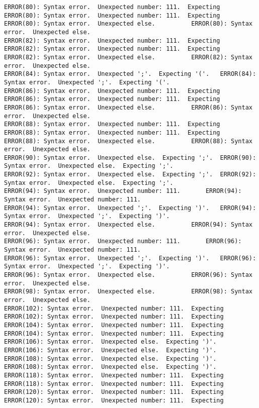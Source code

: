 \documentclass[12pt]{book}
\begin{document}
\begin{lstlisting}
ERROR(80): Syntax error.  Unexpected number: 111.  Expecting 	ERROR(80): Syntax error.  Unexpected number: 111.  Expecting 
ERROR(80): Syntax error.  Unexpected else.			ERROR(80): Syntax error.  Unexpected else.
ERROR(82): Syntax error.  Unexpected number: 111.  Expecting 	ERROR(82): Syntax error.  Unexpected number: 111.  Expecting 
ERROR(82): Syntax error.  Unexpected else.			ERROR(82): Syntax error.  Unexpected else.
ERROR(84): Syntax error.  Unexpected ';'.  Expecting '('.	ERROR(84): Syntax error.  Unexpected ';'.  Expecting '('.
ERROR(86): Syntax error.  Unexpected number: 111.  Expecting 	ERROR(86): Syntax error.  Unexpected number: 111.  Expecting 
ERROR(86): Syntax error.  Unexpected else.			ERROR(86): Syntax error.  Unexpected else.
ERROR(88): Syntax error.  Unexpected number: 111.  Expecting 	ERROR(88): Syntax error.  Unexpected number: 111.  Expecting 
ERROR(88): Syntax error.  Unexpected else.			ERROR(88): Syntax error.  Unexpected else.
ERROR(90): Syntax error.  Unexpected else.  Expecting ';'.	ERROR(90): Syntax error.  Unexpected else.  Expecting ';'.
ERROR(92): Syntax error.  Unexpected else.  Expecting ';'.	ERROR(92): Syntax error.  Unexpected else.  Expecting ';'.
ERROR(94): Syntax error.  Unexpected number: 111.		ERROR(94): Syntax error.  Unexpected number: 111.
ERROR(94): Syntax error.  Unexpected ';'.  Expecting ')'.	ERROR(94): Syntax error.  Unexpected ';'.  Expecting ')'.
ERROR(94): Syntax error.  Unexpected else.			ERROR(94): Syntax error.  Unexpected else.
ERROR(96): Syntax error.  Unexpected number: 111.		ERROR(96): Syntax error.  Unexpected number: 111.
ERROR(96): Syntax error.  Unexpected ';'.  Expecting ')'.	ERROR(96): Syntax error.  Unexpected ';'.  Expecting ')'.
ERROR(96): Syntax error.  Unexpected else.			ERROR(96): Syntax error.  Unexpected else.
ERROR(98): Syntax error.  Unexpected else.			ERROR(98): Syntax error.  Unexpected else.
ERROR(102): Syntax error.  Unexpected number: 111.  Expecting	ERROR(102): Syntax error.  Unexpected number: 111.  Expecting
ERROR(104): Syntax error.  Unexpected number: 111.  Expecting	ERROR(104): Syntax error.  Unexpected number: 111.  Expecting
ERROR(106): Syntax error.  Unexpected else.  Expecting ')'.	ERROR(106): Syntax error.  Unexpected else.  Expecting ')'.
ERROR(108): Syntax error.  Unexpected else.  Expecting ')'.	ERROR(108): Syntax error.  Unexpected else.  Expecting ')'.
ERROR(118): Syntax error.  Unexpected number: 111.  Expecting	ERROR(118): Syntax error.  Unexpected number: 111.  Expecting
ERROR(120): Syntax error.  Unexpected number: 111.  Expecting	ERROR(120): Syntax error.  Unexpected number: 111.  Expecting

\end{lstlisting}
\end{document}
